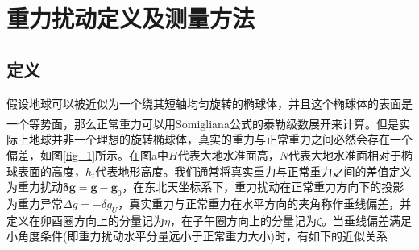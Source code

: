 \documentclass[12pt,a4,utf8]{article}
\newcommand{\upcite}[1]{\textsuperscript{\textsuperscript{\cite{#1}}}} %
\begin{document}
\section{重力扰动定义及测量方法}
\subsection{定义}
假设地球可以被近似为一个绕其短轴均匀旋转的椭球体，并且这个椭球体的表面是一个等势面，那么正常重力可以用Somigliana公式的泰勒级数展开来计算\upcite{somigliana1929teoria}。但是实际上地球并非一个理想的旋转椭球体，真实的重力与正常重力之间必然会存在一个偏差，如图\ref{fig_1}所示。在图a中$H$代表大地水准面高，$N$代表大地水准面相对于椭球表面的高度，$h_t$代表地形高度。我们通常将真实重力与正常重力之间的差值定义为重力扰动$\bm{\delta g} = \bm{g} - \bm{g}_0$，在东北天坐标系下，重力扰动在正常重力方向下的投影为重力异常$\Delta g = -\delta g_U $，真实重力与正常重力在水平方向的夹角称作垂线偏差，并定义在卯酉圈方向上的分量记为$\eta$，在子午圈方向上的分量记为$\zeta$。当垂线偏差满足小角度条件(即重力扰动水平分量远小于正常重力大小)时，有如下的近似关系
 
\end{document}
